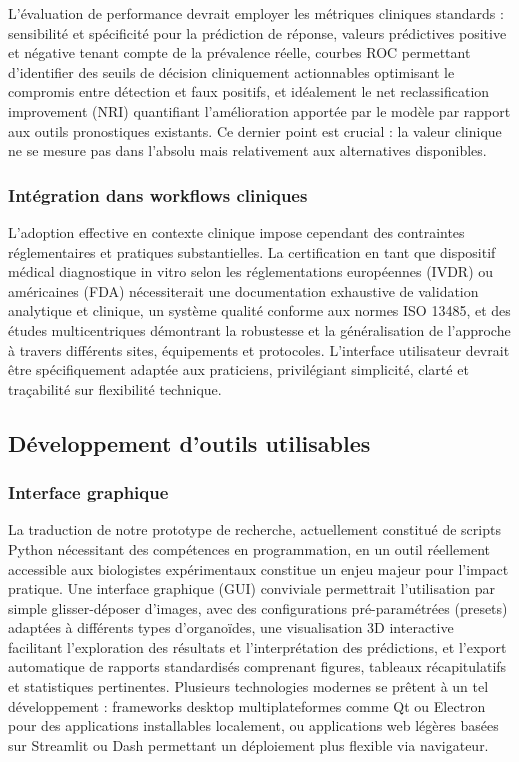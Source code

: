 L'évaluation de performance devrait employer les métriques cliniques standards : sensibilité et spécificité pour la prédiction de réponse, valeurs prédictives positive et négative tenant compte de la prévalence réelle, courbes ROC permettant d'identifier des seuils de décision cliniquement actionnables optimisant le compromis entre détection et faux positifs, et idéalement le net reclassification improvement (NRI) quantifiant l'amélioration apportée par le modèle par rapport aux outils pronostiques existants. Ce dernier point est crucial : la valeur clinique ne se mesure pas dans l'absolu mais relativement aux alternatives disponibles.

\subsubsection{Intégration dans workflows cliniques}

L'adoption effective en contexte clinique impose cependant des contraintes réglementaires et pratiques substantielles. La certification en tant que dispositif médical diagnostique in vitro selon les réglementations européennes (IVDR) ou américaines (FDA) nécessiterait une documentation exhaustive de validation analytique et clinique, un système qualité conforme aux normes ISO 13485, et des études multicentriques démontrant la robustesse et la généralisation de l'approche à travers différents sites, équipements et protocoles. L'interface utilisateur devrait être spécifiquement adaptée aux praticiens, privilégiant simplicité, clarté et traçabilité sur flexibilité technique.

\subsection{Développement d'outils utilisables}

\subsubsection{Interface graphique}

La traduction de notre prototype de recherche, actuellement constitué de scripts Python nécessitant des compétences en programmation, en un outil réellement accessible aux biologistes expérimentaux constitue un enjeu majeur pour l'impact pratique. Une interface graphique (GUI) conviviale permettrait l'utilisation par simple glisser-déposer d'images, avec des configurations pré-paramétrées (presets) adaptées à différents types d'organoïdes, une visualisation 3D interactive facilitant l'exploration des résultats et l'interprétation des prédictions, et l'export automatique de rapports standardisés comprenant figures, tableaux récapitulatifs et statistiques pertinentes. Plusieurs technologies modernes se prêtent à un tel développement : frameworks desktop multiplateformes comme Qt ou Electron pour des applications installables localement, ou applications web légères basées sur Streamlit ou Dash permettant un déploiement plus flexible via navigateur.

